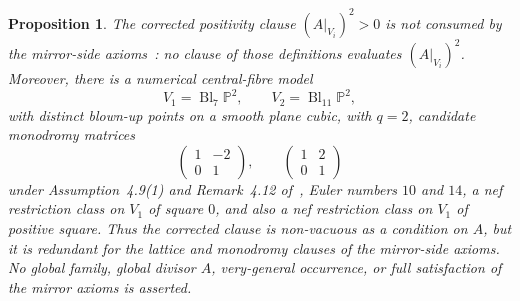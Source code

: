 \documentclass[12pt]{article}
\theoremstyle{plain}
\newtheorem{proposition}[theorem]{Proposition}
\theoremstyle{definition}
\DeclareMathOperator{\Bl}{Bl}
\newcommand{\bP}{\mathbb{P}}
\begin{document}
\begin{proposition}\label{prop:positivity-redundancy}
The corrected positivity clause $(A|_{V_i})^2>0$ is not consumed by the mirror-side axioms~\cite[Definitions~4.11, 4.21 and 5.1]{GT24}: no clause of those definitions evaluates $(A|_{V_i})^2$.  Moreover, there is a numerical central-fibre model
\[
V_1=\Bl_7\bP^2,\qquad V_2=\Bl_{11}\bP^2,
\]
with distinct blown-up points on a smooth plane cubic, with $q=2$, candidate monodromy matrices
\[
\begin{pmatrix}
1 & -2\\
0 & 1
\end{pmatrix},
\qquad
\begin{pmatrix}
1 & 2\\
0 & 1
\end{pmatrix}
\]
under Assumption~4.9(1) and Remark~4.12 of~\cite{GT24}, Euler numbers $10$ and $14$, a nef restriction class on $V_1$ of square $0$, and also a nef restriction class on $V_1$ of positive square.  Thus the corrected clause is non-vacuous as a condition on $A$, but it is redundant for the lattice and monodromy clauses of the mirror-side axioms.  No global family, global divisor $A$, very-general occurrence, or full satisfaction of the mirror axioms is asserted.
\end{proposition}
\end{document}

